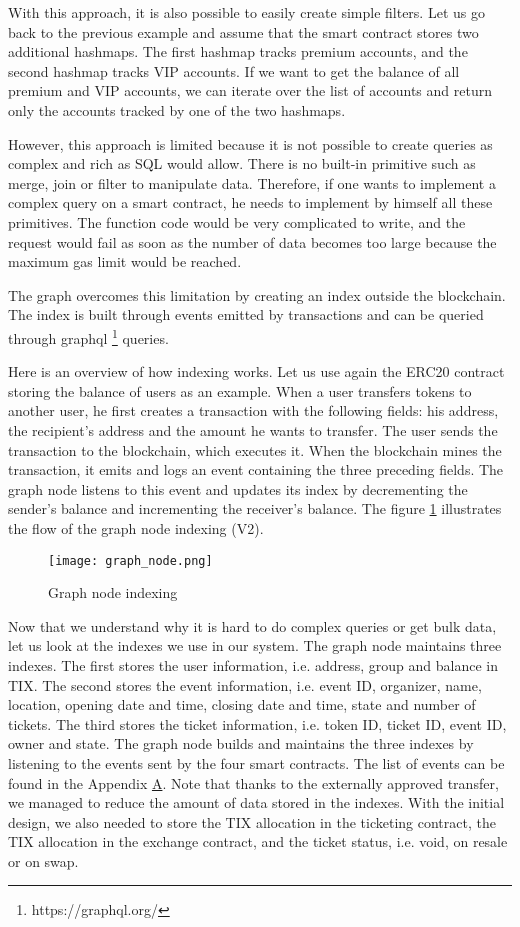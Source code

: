 \documentclass[a4paper,11pt,oneside]{report}
\begin{document}
With this approach, it is also possible to easily create simple filters. Let us go back to the previous example and assume that the smart contract stores two additional hashmaps. The first hashmap tracks premium accounts, and the second hashmap tracks VIP accounts. If we want to get the balance of all premium and VIP accounts, we can iterate over the list of accounts and return only the accounts tracked by one of the two hashmaps.

However, this approach is limited because it is not possible to create queries as complex and rich as SQL would allow. There is no built-in primitive such as merge, join or filter to manipulate data. Therefore, if one wants to implement a complex query on a smart contract, he needs to implement by himself all these primitives. The function code would be very complicated to write, and the request would fail as soon as the number of data becomes too large because the maximum gas limit would be reached.

The graph overcomes this limitation by creating an index outside the blockchain. The index is built through events emitted by transactions and can be queried through graphql \footnote{https://graphql.org/} queries.

Here is an overview of how indexing works. Let us use again the ERC20 contract storing the balance of users as an example. When a user transfers tokens to another user, he first creates a transaction with the following fields: his address, the recipient's address and the amount he wants to transfer. The user sends the transaction to the blockchain, which executes it. When the blockchain mines the transaction, it emits and logs an event containing the three preceding fields. The graph node listens to this event and updates its index by decrementing the sender's balance and incrementing the receiver's balance. The figure \hyperref[fig:graph_node]{\ref{fig:graph_node}} illustrates the flow of the graph node indexing (V2).

\begin{figure}[h!] 
  \centering
  \texttt{[image: graph\_node.png]}
  \caption{Graph node indexing}
  \label{fig:graph_node}
\end{figure}

Now that we understand why it is hard to do complex queries or get bulk data, let us look at the indexes we use in our system. The graph node maintains three indexes. The first stores the user information, i.e. address, group and balance in TIX. The second stores the event information, i.e. event ID, organizer, name, location, opening date and time, closing date and time, state and number of tickets. The third stores the ticket information, i.e. token ID, ticket ID, event ID, owner and state. The graph node builds and maintains the three indexes by listening to the events sent by the four smart contracts. The list of events can be found in the Appendix \hyperref[sec:appendix_a]{A}. Note that thanks to the externally approved transfer, we managed to reduce the amount of data stored in the indexes. With the initial design, we also needed to store the TIX allocation in the ticketing contract, the TIX allocation in the exchange contract, and the ticket status, i.e. void, on resale or on swap.
\end{document}
